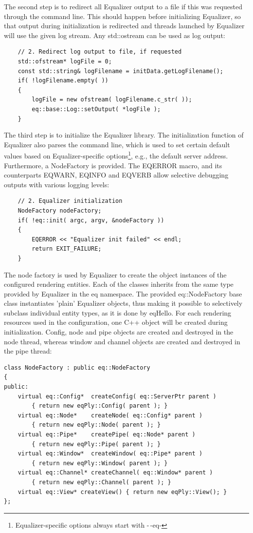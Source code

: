 \documentclass[10pt,a4]{scrartcl}
\begin{document}
The second step is to redirect all Equalizer output to a file if this
was requested through the command line. This should happen before
initializing Equalizer, so that output during initialization is
redirected and threads launched by Equalizer will use the given log
stream. Any \textsf{std::ostream} can be used as log output:

{\footnotesize\begin{lstlisting}
    // 2. Redirect log output to file, if requested
    std::ofstream* logFile = 0;
    const std::string& logFilename = initData.getLogFilename();
    if( !logFilename.empty( ))
    {
        logFile = new ofstream( logFilename.c_str( ));
        eq::base::Log::setOutput( *logFile );
    }
\end{lstlisting}}

The third step is to initialize the Equalizer library. The
initialization function of Equalizer also parses the command line, which
is used to set certain default values based on Equalizer-specific
options\footnote{Equalizer-specific options always start with -\,-eq-},
e.g., the default server address. Furthermore, a \textsf{NodeFactory} is
provided. The \textsf{EQERROR} macro, and its counterparts
\textsf{EQWARN}, \textsf{EQINFO} and \textsf{EQVERB} allow selective
debugging outputs with various logging levels:

{\footnotesize\begin{lstlisting}
    // 2. Equalizer initialization
    NodeFactory nodeFactory;
    if( !eq::init( argc, argv, &nodeFactory ))
    {
        EQERROR << "Equalizer init failed" << endl;
        return EXIT_FAILURE;
    }
\end{lstlisting}}%

The node factory is used by Equalizer to create the object instances of
the configured rendering entities. Each of the classes inherits from the
same type provided by Equalizer in the \textsf{eq} namespace. The
provided \textsf{eq::NodeFactory} base class instantiates 'plain'
Equalizer objects, thus making it possible to selectively subclass
individual entity types, as it is done by \textsf{eqHello}. For each
rendering resources used in the configuration, one C++ object will be
created during initialization. Config, node and pipe objects are created and
destroyed in the node thread, whereas window and channel objects are
created and destroyed in the pipe thread:

{\footnotesize\begin{lstlisting}
class NodeFactory : public eq::NodeFactory
{
public:
    virtual eq::Config*  createConfig( eq::ServerPtr parent )
        { return new eqPly::Config( parent ); }
    virtual eq::Node*    createNode( eq::Config* parent )  
        { return new eqPly::Node( parent ); }
    virtual eq::Pipe*    createPipe( eq::Node* parent )
        { return new eqPly::Pipe( parent ); }
    virtual eq::Window*  createWindow( eq::Pipe* parent )
        { return new eqPly::Window( parent ); }
    virtual eq::Channel* createChannel( eq::Window* parent )
        { return new eqPly::Channel( parent ); }
    virtual eq::View* createView() { return new eqPly::View(); }
};
\end{lstlisting}}
\end{document}
